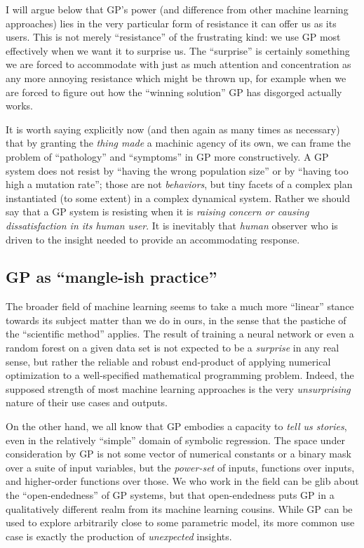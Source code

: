 I will argue below that GP's power (and difference from other machine learning approaches) lies in the very particular form of resistance it can offer us as its users. This is not merely ``resistance'' of the frustrating kind: we use GP most effectively when we want it to surprise us. The ``surprise'' is certainly something we are forced to accommodate with just as much attention and concentration as any more annoying resistance which might be thrown up, for example when we are forced to figure out how the ``winning solution'' GP has disgorged actually works.

It is worth saying explicitly now (and then again as many times as necessary) that by granting the \emph{thing made} a machinic agency of its own, we can frame the problem of ``pathology'' and ``symptoms'' in GP more constructively. A GP system does not resist by ``having the wrong population size'' or by ``having too high a mutation rate''; those are not \emph{behaviors}, but tiny facets of a complex plan instantiated (to some extent) in a complex dynamical system. Rather we should say that a GP system is resisting when it is \emph{raising concern or causing dissatisfaction in its human user}. It is inevitably that \emph{human} observer who is driven to the insight needed to provide an accommodating response.

\subsection{GP as ``mangle-ish practice''}\hypertarget{gp-as-mangle-ish-practice}{}\label{gp-as-mangle-ish-practice}

The broader field of machine learning seems to take a much more ``linear'' stance towards its subject matter than we do in ours, in the sense that the pastiche of the ``scientific method'' applies. The result of training a neural network or even a random forest on a given data set is not expected to be a \emph{surprise} in any real sense, but rather the reliable and robust end-product of applying numerical optimization to a well-specified mathematical programming problem. Indeed, the supposed strength of most machine learning approaches is the very \emph{unsurprising} nature of their use cases and outputs.

On the other hand, we all know that GP embodies a capacity to \emph{tell us stories}, even in the relatively ``simple'' domain of symbolic regression. The space under consideration by GP is not some vector of numerical constants or a binary mask over a suite of input variables, but the \emph{power-set} of inputs, functions over inputs, and higher-order functions over those. We who work in the field can be glib about the ``open-endedness'' of GP systems, but that open-endedness puts GP in a qualitatively different realm from its machine learning cousins. While GP can be used to explore arbitrarily close to some parametric model, its more common use case is exactly the production of \emph{unexpected} insights.


